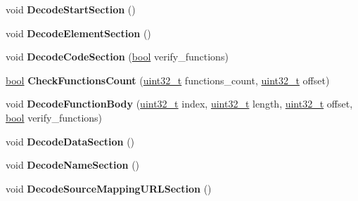 \begin{DoxyCompactItemize}
void {\bfseries Decode\+Start\+Section} ()
\item 
\mbox{\label{classv8_1_1internal_1_1wasm_1_1ModuleDecoderImpl_a712b92c4d92cb10358454c0464fabfd1}} 
void {\bfseries Decode\+Element\+Section} ()
\item 
\mbox{\label{classv8_1_1internal_1_1wasm_1_1ModuleDecoderImpl_ae6ff24cbb3ce3d869effe70ccba69b36}} 
void {\bfseries Decode\+Code\+Section} (\mbox{\hyperlink{classbool}{bool}} verify\+\_\+functions)
\item 
\mbox{\label{classv8_1_1internal_1_1wasm_1_1ModuleDecoderImpl_ac6a40e8fe6308ad5cfe3d5724e7de107}} 
\mbox{\hyperlink{classbool}{bool}} {\bfseries Check\+Functions\+Count} (\mbox{\hyperlink{classuint32__t}{uint32\+\_\+t}} functions\+\_\+count, \mbox{\hyperlink{classuint32__t}{uint32\+\_\+t}} offset)
\item 
\mbox{\label{classv8_1_1internal_1_1wasm_1_1ModuleDecoderImpl_af4fdc71b42d8e27ca6b618a24949e10d}} 
void {\bfseries Decode\+Function\+Body} (\mbox{\hyperlink{classuint32__t}{uint32\+\_\+t}} index, \mbox{\hyperlink{classuint32__t}{uint32\+\_\+t}} length, \mbox{\hyperlink{classuint32__t}{uint32\+\_\+t}} offset, \mbox{\hyperlink{classbool}{bool}} verify\+\_\+functions)
\item 
\mbox{\label{classv8_1_1internal_1_1wasm_1_1ModuleDecoderImpl_a1bdef7e055fc1f35401bd856d884114e}} 
void {\bfseries Decode\+Data\+Section} ()
\item 
\mbox{\label{classv8_1_1internal_1_1wasm_1_1ModuleDecoderImpl_a70a84c0f6fa6e22ce204d654f43bcaa7}} 
void {\bfseries Decode\+Name\+Section} ()
\item 
\mbox{\label{classv8_1_1internal_1_1wasm_1_1ModuleDecoderImpl_a6203c40abfa191e7faba79169b0d4724}} 
void {\bfseries Decode\+Source\+Mapping\+U\+R\+L\+Section} ()
\item 
\mbox{\label{classv8_1_1internal_1_1wasm_1_1ModuleDecoderImpl_a6e77944d81acefee2eb37a620c45f438}} 

\end{DoxyCompactItemize}
